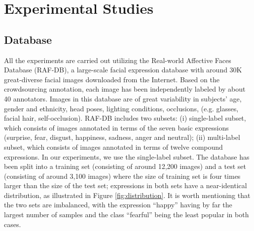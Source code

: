 \documentclass[10pt,twocolumn,letterpaper]{article}
\begin{document}
\section{Experimental Studies}


\subsection{Database}


All the experiments are carried out utilizing the Real-world Affective Faces Database (RAF-DB), a large-scale facial expression database with around 30K great-diverse facial images downloaded from the Internet. Based on the crowdsourcing annotation, each image has been independently labeled by about 40 annotators. Images in this database are of great variability in subjects' age, gender and ethnicity, head poses, lighting conditions, occlusions, (e.g. glasses, facial hair, self-occlusion). RAF-DB includes two subsets: (i) single-label subset, which consists of images annotated in terms of the seven basic expressions (surprise, fear, disgust, happiness, sadness, anger and neutral); (ii) multi-label subset, which consists of images annotated in terms of twelve compound expressions. In our experiments, we use the single-label subset. 
The database has been split into a training set (consisting of around 12,200 images) and a test set (consisting of around 3,100 images) where the size of training set is four times larger than the size of the test set; expressions in both sets have a near-identical distribution, as illustrated in Figure \ref{fig:distribution}. It is worth mentioning that the two sets are imbalanced, with the expression \enquote{happy} having by far the largest number of samples and the class \enquote{fearful} being the least popular in both cases.

\begin{figure*}[t]
  \centering
{}
 \caption{Class distribution of the RAF-DB training and test sets}
 \label{fig:distribution}
\end{figure*}
\end{document}
